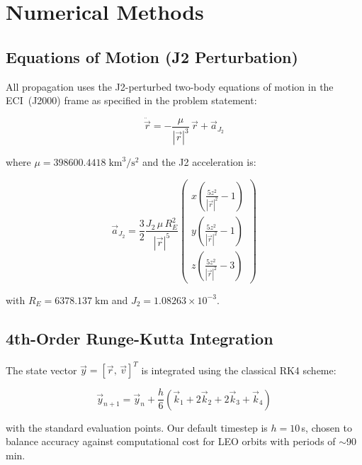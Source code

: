 \documentclass[11pt, a4paper]{article}
\begin{document}
\section{Numerical Methods}

\subsection{Equations of Motion (J2 Perturbation)}

All propagation uses the J2-perturbed two-body equations of motion in the ECI~(J2000) frame as specified in the problem statement:

\begin{equation}
  \ddot{\vec{r}} = -\frac{\mu}{|\vec{r}|^3}\,\vec{r} + \vec{a}_{J_2}
\end{equation}

where $\mu = 398600.4418\;\text{km}^3/\text{s}^2$ and the J2 acceleration is:

\begin{equation}
  \vec{a}_{J_2} = \frac{3}{2}\frac{J_2\,\mu\,R_E^2}{|\vec{r}|^5}
  \begin{pmatrix}
    x\left(\frac{5z^2}{|\vec{r}|^2} - 1\right) \\[4pt]
    y\left(\frac{5z^2}{|\vec{r}|^2} - 1\right) \\[4pt]
    z\left(\frac{5z^2}{|\vec{r}|^2} - 3\right)
  \end{pmatrix}
\end{equation}

with $R_E = 6378.137\;\text{km}$ and $J_2 = 1.08263 \times 10^{-3}$.

\subsection{4th-Order Runge-Kutta Integration}

The state vector $\vec{y} = [\vec{r},\, \vec{v}]^T$ is integrated using the classical RK4 scheme:

\begin{equation}
  \vec{y}_{n+1} = \vec{y}_n + \frac{h}{6}\left(\vec{k}_1 + 2\vec{k}_2 + 2\vec{k}_3 + \vec{k}_4\right)
\end{equation}

with the standard evaluation points. Our default timestep is $h = 10$\,s, chosen to balance accuracy against computational cost for LEO orbits with periods of $\sim$90\,min.
\end{document}

